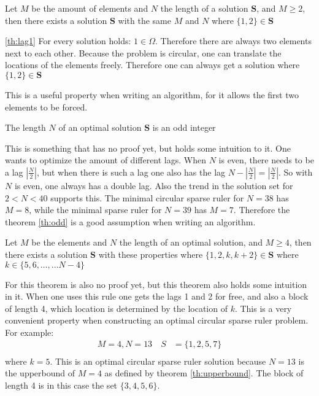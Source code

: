 \documentclass[a4paper, openany, oneside]{memoir}
\begin{document}
\begin{blockTheorem} \label{th:lag1}\nolinebreak
    Let $M$ be the amount of elements and $N$ the length of a solution $\mathbf{S}$, and $M\geq 2$, then there exists a solution $\mathbf{S}$ with the same $M$ and $N$ where $\{1,2\} \in \mathbf{S}$  \nolinebreak
\end{blockTheorem}

\begin{blockProofTheorem}{\ref{th:lag1}}
    For every solution holds: $1 \in \Omega$. Therefore there are always two elements next to each other. Because the problem is circular, one can translate the locations of the elements freely. Therefore one can always get a solution where $\{1,2\} \in \mathbf{S}$
\end{blockProofTheorem}

This is a useful property when writing an algorithm, for it allows the first two elements to be forced.

\begin{blockTheorem} \label{th:odd}\nolinebreak
    The length $N$ of an optimal solution $\mathbf{S}$ is an odd integer \nolinebreak
\end{blockTheorem}

This is something that has no proof yet, but holds some intuition to it. One wants to optimize the amount of different lags. When $N$ is even, there  needs to be a lag $|\frac{N}{2}|$, but when there is such a lag one also has the lag $N-|\frac{N}{2}|=|\frac{N}{2}|$. So with $N$ is even, one always has a double lag. Also the trend in the solution set for $2<N<40$ supports this. The minimal circular sparse ruler for $N=38$ has $M=8$, while the minimal sparse ruler for $N=39$ has $M=7$. Therefore the theorem \ref{th:odd} is a good assumption when writing an algorithm.

\begin{blockTheorem} \label{th:lag2}\nolinebreak
    Let $M$ be the elements and $N$ the length of an optimal solution, and $M\geq 4$, then there exists a solution $\mathbf{S}$ with these properties where $\{1,2,k, k+2\} \in \mathbf{S}$ where $k \in \{5,6,\dots,...N-4\}$   \nolinebreak
\end{blockTheorem}

For this theorem is also no proof yet, but this theorem also holds some intuition in it. When one uses this rule one gets the lags 1 and 2 for free, and also a block of length 4, which location is determined by the location of $k$. This is a very convenient property when constructing an optimal circular sparse ruler problem. 
For example:
\begin{align}
M=4,N=13 \quad S&=\{1,2,5,7\}\\
\end{align}
where $k=5$. This is an optimal circular sparse ruler solution because $N=13$ is the upperbound of $M=4$ as defined by theorem \ref{th:upperbound}. The block of length 4 is in this case the set $\{3,4,5,6\}$.
\end{document}
